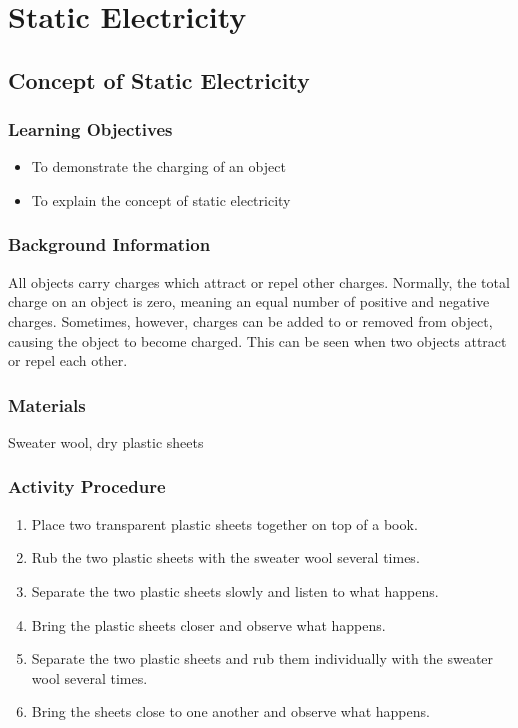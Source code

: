 \section{Static Electricity}

\subsection{Concept of Static Electricity}

\subsubsection*{Learning Objectives}
\begin{itemize}
\item{To demonstrate the charging of an object} 
\item{To explain the concept of static electricity} 
\end{itemize}

\subsubsection*{Background Information}
All objects carry charges which attract or repel other charges. Normally, the total charge on an object is zero, meaning an equal number of positive and negative charges. Sometimes, however, charges can be added to or removed from object, causing the object to become charged. This can be seen when two objects attract or repel each other.  

\subsubsection*{Materials}
Sweater wool, dry plastic sheets

\subsubsection*{Activity Procedure}
\begin{enumerate}
\item{Place two transparent plastic sheets together on top of a book.}
\item{Rub the two plastic sheets with the sweater wool several times.} 
\item{Separate the two plastic sheets slowly and listen to what happens.} 
\item{Bring the plastic sheets closer and observe what happens.} 
\item{Separate the two plastic sheets and rub them individually with the sweater wool several times.} 
\item{Bring the sheets close to one another and observe what happens.} 
\end{enumerate}

